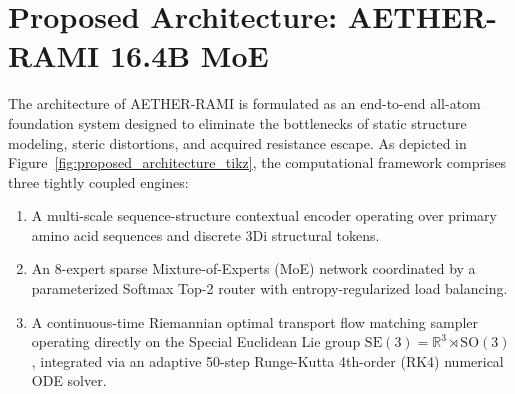 \section{Proposed Architecture: AETHER-RAMI 16.4B MoE}
\label{sec:arch}
The architecture of AETHER-RAMI is formulated as an end-to-end all-atom foundation system designed to eliminate the bottlenecks of static structure modeling, steric distortions, and acquired resistance escape. As depicted in Figure~\ref{fig:proposed_architecture_tikz}, the computational framework comprises three tightly coupled engines:
\begin{enumerate}
    \item A multi-scale sequence-structure contextual encoder operating over primary amino acid sequences and discrete 3Di structural tokens.
    \item An 8-expert sparse Mixture-of-Experts (MoE) network coordinated by a parameterized Softmax Top-2 router with entropy-regularized load balancing.
    \item A continuous-time Riemannian optimal transport flow matching sampler operating directly on the Special Euclidean Lie group $\mathrm{SE}(3) = \mathbb{R}^3 \rtimes \mathrm{SO}(3)$, integrated via an adaptive 50-step Runge-Kutta 4th-order (RK4) numerical ODE solver.
\end{enumerate}

